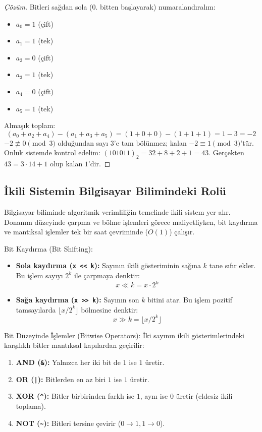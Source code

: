 \begin{proof}[Çözüm]
Bitleri sağdan sola ($0$. bitten başlayarak) numaralandıralım:
\begin{itemize}
    \item $a_0 = 1$ (çift)
    \item $a_1 = 1$ (tek)
    \item $a_2 = 0$ (çift)
    \item $a_3 = 1$ (tek)
    \item $a_4 = 0$ (çift)
    \item $a_5 = 1$ (tek)
\end{itemize}

Almaşık toplam:
\[
(a_0 + a_2 + a_4) - (a_1 + a_3 + a_5) = (1 + 0 + 0) - (1 + 1 + 1) = 1 - 3 = -2
\]
$-2 \not\equiv 0 \pmod 3$ olduğundan sayı $3$'e tam bölünmez; kalan $-2 \equiv 1 \pmod 3$'tür.
Onluk sistemde kontrol edelim: $(101011)_2 = 32 + 8 + 2 + 1 = 43$. Gerçekten $43 = 3 \cdot 14 + 1$ olup kalan $1$'dir.
\end{proof}

\subsection{İkili Sistemin Bilgisayar Bilimindeki Rolü}

Bilgisayar biliminde algoritmik verimliliğin temelinde ikili sistem yer alır. Donanım düzeyinde çarpma ve bölme işlemleri görece maliyetliyken, bit kaydırma ve mantıksal işlemler tek bir saat çevriminde ($O(1)$) çalışır.

Bit Kaydırma (Bit Shifting):
\begin{itemize}
    \item \textbf{Sola kaydırma (\texttt{x << k}):} Sayının ikili gösteriminin sağına $k$ tane sıfır ekler. Bu işlem sayıyı $2^k$ ile çarpmaya denktir:
    \[
    x \ll k = x \cdot 2^k
    \]
    \item \textbf{Sağa kaydırma (\texttt{x >> k}):} Sayının son $k$ bitini atar. Bu işlem pozitif tamsayılarda $\lfloor x / 2^k \rfloor$ bölmesine denktir:
    \[
    x \gg k = \lfloor x / 2^k \rfloor
    \]
\end{itemize}

Bit Düzeyinde İşlemler (Bitwise Operators):
İki sayının ikili gösterimlerindeki karşılıklı bitler mantıksal kapılardan geçirilir:
\begin{enumerate}
    \item \textbf{AND (\texttt{\&}):} Yalnızca her iki bit de $1$ ise $1$ üretir.
    \item \textbf{OR (\texttt{|}):} Bitlerden en az biri $1$ ise $1$ üretir.
    \item \textbf{XOR (\texttt{\textasciicircum}):} Bitler birbirinden farklı ise $1$, aynı ise $0$ üretir (eldesiz ikili toplama).
    \item \textbf{NOT (\texttt{\textasciitilde}):} Bitleri tersine çevirir ($0 \to 1, 1 \to 0$).
\end{enumerate}

